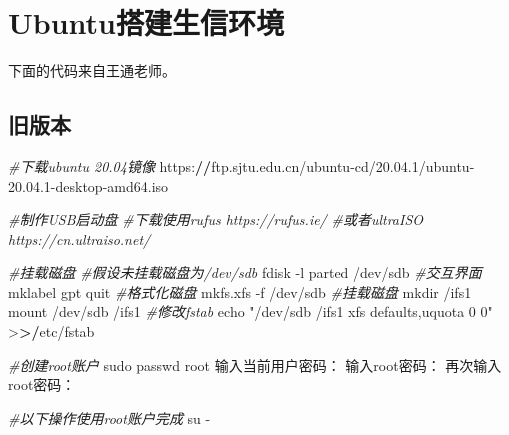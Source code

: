 \documentclass[
  10pt,
]{book}
\newenvironment{Shaded}{\begin{snugshade}}{\end{snugshade}}
\newcommand{\CommentTok}[1]{\textcolor[rgb]{0.56,0.35,0.01}{\textit{#1}}}
\newcommand{\DecValTok}[1]{\textcolor[rgb]{0.00,0.00,0.81}{#1}}
\newcommand{\ErrorTok}[1]{\textcolor[rgb]{0.64,0.00,0.00}{\textbf{#1}}}
\newcommand{\FloatTok}[1]{\textcolor[rgb]{0.00,0.00,0.81}{#1}}
\newcommand{\NormalTok}[1]{#1}
\newcommand{\SpecialCharTok}[1]{\textcolor[rgb]{0.00,0.00,0.00}{#1}}
\newcommand{\StringTok}[1]{\textcolor[rgb]{0.31,0.60,0.02}{#1}}
\begin{document}
\hypertarget{ubuntuux642dux5efaux751fux4fe1ux73afux5883}{%
\section{Ubuntu搭建生信环境}\label{ubuntuux642dux5efaux751fux4fe1ux73afux5883}}

下面的代码来自王通老师。

\hypertarget{ux65e7ux7248ux672c}{%
\subsection{旧版本}\label{ux65e7ux7248ux672c}}

\begin{Shaded}
\begin{Highlighting}[]
\CommentTok{\#下载ubuntu 20.04镜像}
\NormalTok{https}\SpecialCharTok{:}\ErrorTok{//}\NormalTok{ftp.sjtu.edu.cn}\SpecialCharTok{/}\NormalTok{ubuntu}\SpecialCharTok{{-}}\NormalTok{cd}\SpecialCharTok{/}\DecValTok{20}\NormalTok{.}\FloatTok{04.1}\SpecialCharTok{/}\NormalTok{ubuntu}\DecValTok{{-}20}\NormalTok{.}\FloatTok{04.1}\SpecialCharTok{{-}}\NormalTok{desktop}\SpecialCharTok{{-}}\NormalTok{amd64.iso}

\CommentTok{\#制作USB启动盘}
\CommentTok{\#下载使用rufus https://rufus.ie/}
\CommentTok{\#或者ultraISO https://cn.ultraiso.net/}

\CommentTok{\#挂载磁盘}
\CommentTok{\#假设未挂载磁盘为/dev/sdb}
\NormalTok{fdisk }\SpecialCharTok{{-}}\NormalTok{l}
\NormalTok{parted }\SpecialCharTok{/}\NormalTok{dev}\SpecialCharTok{/}\NormalTok{sdb}
\CommentTok{\#交互界面 }
\NormalTok{mklabel gpt}
\NormalTok{quit}
\CommentTok{\#格式化磁盘}
\NormalTok{mkfs.xfs }\SpecialCharTok{{-}}\NormalTok{f }\SpecialCharTok{/}\NormalTok{dev}\SpecialCharTok{/}\NormalTok{sdb }
\CommentTok{\#挂载磁盘}
\NormalTok{mkdir }\SpecialCharTok{/}\NormalTok{ifs1}
\NormalTok{mount }\SpecialCharTok{/}\NormalTok{dev}\SpecialCharTok{/}\NormalTok{sdb }\SpecialCharTok{/}\NormalTok{ifs1}
\CommentTok{\#修改fstab}
\NormalTok{echo }\StringTok{"/dev/sdb /ifs1                       xfs     defaults,uquota        0 0"} \SpecialCharTok{\textgreater{}}\ErrorTok{\textgreater{}/}\NormalTok{etc}\SpecialCharTok{/}\NormalTok{fstab}

\CommentTok{\#创建root账户}
\NormalTok{sudo passwd root}
\NormalTok{输入当前用户密码：}
\NormalTok{输入root密码：}
\NormalTok{再次输入root密码：}

\CommentTok{\#以下操作使用root账户完成}
\NormalTok{su }\SpecialCharTok{{-}}


\end{Highlighting}
\end{Shaded}
\end{document}
